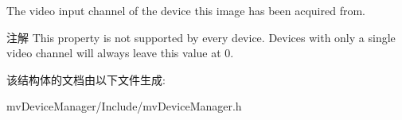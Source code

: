 The video input channel of the device this image has been acquired from. 

\begin{DoxyNote}{注解}
This property is not supported by every device. Devices with only a single video channel will always leave this value at 0. 
\end{DoxyNote}


该结构体的文档由以下文件生成\+:\begin{DoxyCompactItemize}
\item 
mv\+Device\+Manager/\+Include/mv\+Device\+Manager.\+h\end{DoxyCompactItemize}

